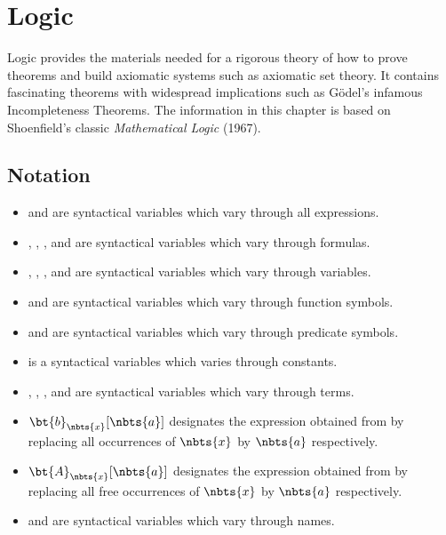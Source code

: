 \chapter{Logic}

Logic provides the materials needed for a rigorous theory of how 
to prove theorems and build axiomatic systems such as axiomatic 
set theory. It contains fascinating theorems with widespread 
implications such as G\"odel's infamous Incompleteness Theorems. 
The information in this chapter is based on Shoenfield's classic 
\emph{Mathematical Logic} (1967).


\newpage

\section{Notation}

\begin{itemize}
	\item {} and  are syntactical variables which vary 
	through all expressions.
	
	\item {}, , , and  are syntactical 
	variables which vary through formulas.
	
	\item {}, , , and  are syntactical 
	variables which vary through variables.
	
	\item {} and  are syntactical variables which vary 
	through function symbols.
	
	\item {} and  are syntactical variables which vary 
	through predicate symbols.
	
	\item {} is a syntactical variables which varies through 
	constants.
	
	\item {}, , , and  are syntactical  
	variables which vary through terms.
	
	\item $\bt{b}_{\nbts{x}}[\nbts{a}]$ 
	designates the expression obtained from  by replacing 
	all occurrences of $\nbts{x}$ by $\nbts{a}$ respectively.
	
	\item $\bt{A}_{\nbts{x}}[\nbts{a}]$ 
	designates the expression obtained from  by replacing 
	all free occurrences of $\nbts{x}$ by $\nbts{a}$ respectively.
	
	\item {} and  are syntactical variables which vary 
	through names.
\end{itemize}

